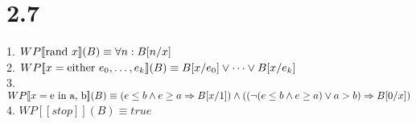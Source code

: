 \documentclass{article}
\begin{document}
\section*{2.7}

1. $ WP[\![\hbox{rand }x]\!](B) \equiv \forall n: B[n/x] $ \\
2. $ WP[\![x=\hbox{either }e_{0}, \dots, e_{k}]\!](B) \equiv B[x/e_{0}] \lor \dots \lor B[x/e_{k}] $ \\
3. $ WP[\![x=\hbox{e in a, b}]\!](B) \equiv (e \le b \land e \ge a \Rightarrow B[x/1]) \land ((\neg (e \le b \land e \ge a) \lor a>b) \Rightarrow B[0/x]) $ \\
4. $ WP[\![stop]\!](B) \equiv true $
\end{document}

